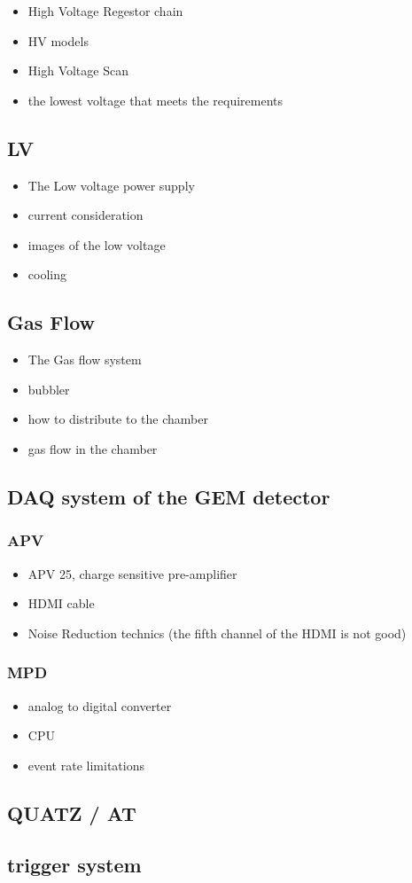 \begin{itemize}
    \item High Voltage Regestor chain 
    \item HV models 
    \item High Voltage Scan
    \item the lowest voltage that meets the requirements
\end{itemize}

\subsection{LV}

\begin{itemize}
    \item The Low voltage power supply
    \item current consideration 
    \item images of the low voltage
    \item cooling 
\end{itemize}

\subsection{Gas Flow}

    \begin{itemize}
        \item The Gas flow system
        \item bubbler
        \item how to distribute to the chamber 
        \item gas flow in the chamber
    \end{itemize}

\subsection{DAQ system of the GEM detector}

\subsubsection{APV}
\begin{itemize}
    \item APV 25, charge sensitive pre-amplifier
    \item HDMI cable
    \item Noise Reduction technics (the fifth channel of the HDMI is not good)
\end{itemize}

\subsubsection{MPD}

\begin{itemize}
    \item analog to digital converter
    \item CPU 
    \item event rate limitations
\end{itemize}



\subsection{QUATZ / AT}
\subsection{trigger system}

